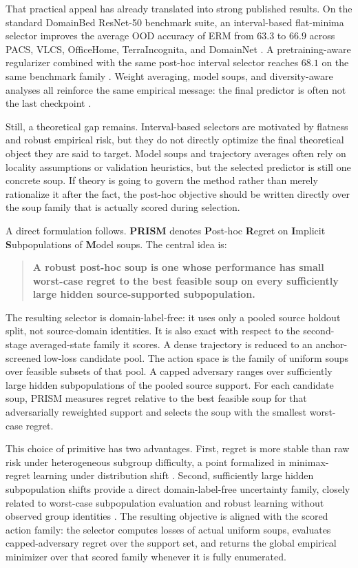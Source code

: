 \documentclass{article}
\newcommand{\prism}{\textup{\textsc{PRISM}}}
\newcommand{\erm}{\textup{\textsc{ERM}}}
\newcommand{\ood}{OOD}
\newcommand{\1}{\mathbbm{1}}
\begin{document}
That practical appeal has already translated into strong published results. On the standard DomainBed ResNet-50 benchmark suite, an interval-based flat-minima selector improves the average \ood{} accuracy of \erm{} from \(63.3\) to \(66.9\) across PACS, VLCS, OfficeHome, TerraIncognita, and DomainNet \citep{cha2021swad}. A pretraining-aware regularizer combined with the same post-hoc interval selector reaches \(68.1\) on the same benchmark family \citep{cha2022miro}. Weight averaging, model soups, and diversity-aware analyses all reinforce the same empirical message: the final predictor is often not the last checkpoint \citep{izmailov2018swa,wortsman2022soups,rame2022diwa}.

Still, a theoretical gap remains. Interval-based selectors are motivated by flatness and robust empirical risk, but they do not directly optimize the final theoretical object they are said to target. Model soups and trajectory averages often rely on locality assumptions or validation heuristics, but the selected predictor is still one concrete soup. If theory is going to govern the method rather than merely rationalize it after the fact, the post-hoc objective should be written directly over the soup family that is actually scored during selection.

A direct formulation follows. \textbf{\prism{}} denotes \textbf{P}ost-hoc \textbf{R}egret on \textbf{I}mplicit \textbf{S}ubpopulations of \textbf{M}odel soups. The central idea is:
\begin{quote}
\textbf{A robust post-hoc soup is one whose performance has small worst-case regret to the best feasible soup on every sufficiently large hidden source-supported subpopulation.}
\end{quote}

The resulting selector is domain-label-free: it uses only a pooled source holdout split, not source-domain identities. It is also exact with respect to the second-stage averaged-state family it scores. A dense trajectory is reduced to an anchor-screened low-loss candidate pool. The action space is the family of uniform soups over feasible subsets of that pool. A capped adversary ranges over sufficiently large hidden subpopulations of the pooled source support. For each candidate soup, \prism{} measures regret relative to the best feasible soup for that adversarially reweighted support and selects the soup with the smallest worst-case regret.

This choice of primitive has two advantages. First, regret is more stable than raw risk under heterogeneous subgroup difficulty, a point formalized in minimax-regret learning under distribution shift \citep{agarwal2022mro}. Second, sufficiently large hidden subpopulation shifts provide a direct domain-label-free uncertainty family, closely related to worst-case subpopulation evaluation and robust learning without observed group identities \citep{li2021worstcase,hashimoto2018fairness,lahoti2020fairness}. The resulting objective is aligned with the scored action family: the selector computes losses of actual uniform soups, evaluates capped-adversary regret over the support set, and returns the global empirical minimizer over that scored family whenever it is fully enumerated.
\end{document}

